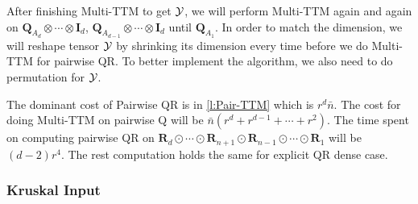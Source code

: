 \documentclass{article}
\newcommand{\mat}[1]{\mathbf{#1}}
\newcommand{\T}[2][]{#1{\mathbf{\cal{#2}}}} 						%
\begin{document}
After finishing Multi-TTM to get $\T[]{Y}$, we will perform Multi-TTM again and again on $\mat{Q}_{A_d} \otimes \cdots \otimes \mat{I}_d$, $\mat{Q}_{A_{d-1}} \otimes \cdots \otimes \mat{I}_d$ until $\mat{Q}_{A_1}$.
In order to match the dimension, we will reshape tensor $\T[]{Y}$ by shrinking its dimension every time before we do Multi-TTM for pairwise QR.
To better implement the algorithm, we also need to do permutation for $\T[]{Y}$.

The dominant cost of Pairwise QR is in \cref{l:Pair-TTM} which is $r^d\bar{n}$. 
The cost for doing Multi-TTM on pairwise Q will be $\bar{n}(r^d + r^{d-1}+\cdots + r^2)$. 
The time spent on computing pairwise QR on $\mat{R}_d \odot \cdots \odot \mat{R}_{n+1} \odot \mat{R}_{n-1} \odot \cdots \odot \mat{R}_1$ will be $(d-2)r^4$.
The rest computation holds the same for explicit QR dense case.
\subsubsection{Kruskal Input}
\end{document}
